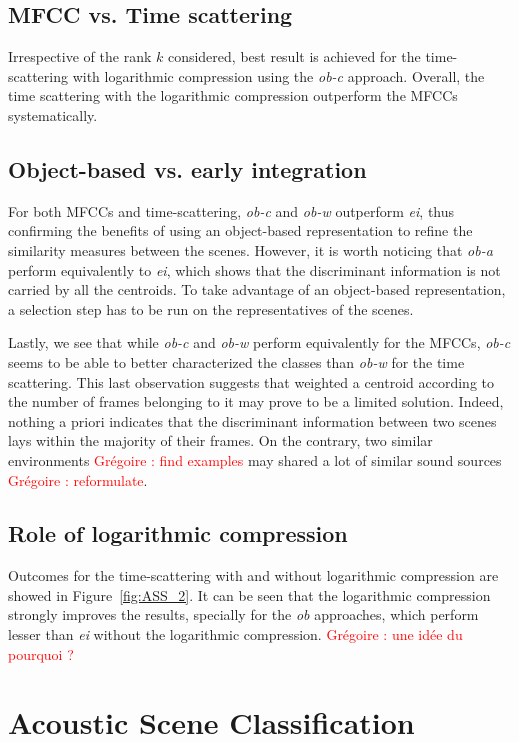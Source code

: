 \documentclass[journal]{IEEEtran}
\makeatletter
\newcommand*{\vs}{vs.\@\xspace}
\newcommand{\gl}[1]{\textcolor{red}{Gr\'egoire : #1}}
\makeatother
\begin{document}
\subsection{MFCC \vs Time scattering}

Irrespective of the rank $k$ considered, best result is achieved for the time-scattering with logarithmic compression using the \emph{ob-c} approach. Overall, the time scattering with the logarithmic compression outperform the MFCCs systematically.

\subsection{Object-based \vs early integration}

For both MFCCs and time-scattering, \emph{ob-c} and \emph{ob-w} outperform \emph{ei}, thus confirming the benefits of using an object-based representation to refine the similarity measures between the scenes. However, it is worth noticing that \emph{ob-a} perform equivalently to \emph{ei}, which shows that the discriminant information is not carried by all the centroids. To take advantage of an object-based representation, a selection step has to be run on the representatives of the scenes.

Lastly, we see that while \emph{ob-c} and \emph{ob-w} perform equivalently for the MFCCs, \emph{ob-c} seems to be able to better characterized the classes than \emph{ob-w} for the time scattering. This last observation suggests that weighted a centroid according to the number of frames belonging to it may prove to be a limited solution. Indeed, nothing a priori indicates that the discriminant information between two scenes lays within the majority of their frames. On the contrary, two similar environments  \gl{find examples} may shared a lot of similar sound sources \gl{reformulate}.

\subsection{Role of logarithmic compression}

Outcomes for the time-scattering with and without logarithmic compression are showed in Figure~\ref{fig:ASS_2}. It can be seen that the logarithmic compression strongly improves the results, specially for the \emph{ob} approaches, which perform lesser than \emph{ei} without the logarithmic compression. \gl{une idée du pourquoi ?}

\section{Acoustic Scene Classification}
\end{document}
